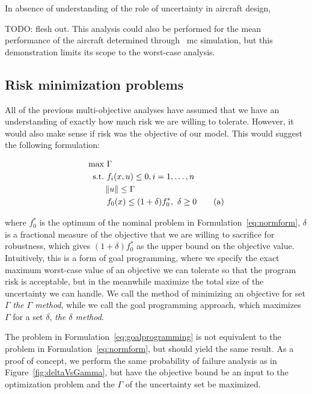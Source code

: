 

In absence of understanding of the role of uncertainty in aircraft design,

TODO: flesh out.
This analysis could also be performed for the mean performance
of the aircraft determined through ~\gls{mc} simulation, but this demonstration limits
its scope to the worst-case analysis.

\subsection{Risk minimization problems}

All of the previous multi-objective analyses have assumed that we have an
understanding of exactly how much risk we are
willing to tolerate. However, it would also make sense if risk was the objective of our
model. This would suggest the following formulation:

\begin{align*}
    \text{max} &~\Gamma \\
    \text{s.t.}     &~f_i(x,u) \leq 0, i = 1,\ldots,n \\
                    & \left\lVert u\right\rVert \leq \Gamma \\
                    &~f_0(x) \leq (1+\delta)f_0^*,~\delta \geq 0 \tag{a}
    \label{eq:goalprogramming}
\end{align*}

where $f_0^*$ is the optimum of the nominal problem in Formulation~\ref{eq:normform}, $\delta$
is a fractional measure of the objective that we are willing to sacrifice for robustness, which
gives $(1+\delta)f_0^*$ as the upper bound on the objective value. Intuitively,
this is a form of goal programming,
where we specify the exact maximum worst-case value of an objective we can tolerate so that the program
risk is acceptable, but in the meanwhile maximize the total size of the uncertainty we can handle.
We call the method of minimizing an objective for set ${\Gamma}$ \emph{the $\Gamma$ method},
while we call the goal programming approach, which maximizes $\Gamma$ for a set $\delta$,
\emph{the $\delta$ method}.

The problem in Formulation~\ref{eq:goalprogramming} is not equivalent to the problem in Formulation~\ref{eq:normform},
but should yield the same result. As a proof of concept, we perform the same probability of failure
analysis as in Figure~\ref{fig:deltaVsGamma}, but have the objective bound be an input to the
optimization problem and the $\Gamma$ of the uncertainty set be maximized.

